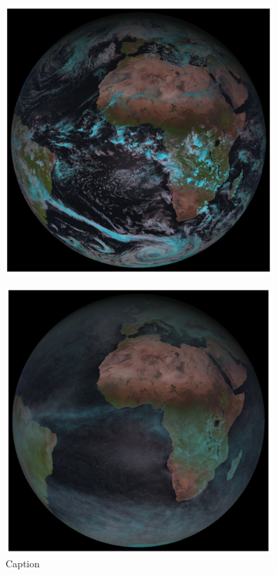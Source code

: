 
\begin{figure}
    \centering
    \includegraphics[width=0.9\textwidth]{2019-01-05 122743.pdf}
    \caption{}
    \label{fig:my_label}
\end{figure}

\begin{figure}[hbt!]
    \centering
    \includegraphics[width=0.9\textwidth]{2019-01-05 122743_av.pdf}
    \caption{Caption}
    \label{fig:my_label}
\end{figure}

